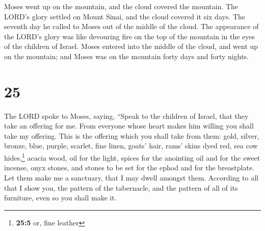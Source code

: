  Moses went up on the mountain, and the cloud covered the
mountain.  The LORD's glory settled on Mount Sinai, and
the cloud covered it six days. The seventh day he called to Moses out of
the middle of the cloud.  The appearance of the LORD's
glory was like devouring fire on the top of the mountain in the eyes of
the children of Israel.  Moses entered into the middle of
the cloud, and went up on the mountain; and Moses was on the mountain
forty days and forty nights.

\hypertarget{section-24}{%
\section{25}\label{section-24}}

 The LORD spoke to Moses, saying,  ``Speak
to the children of Israel, that they take an offering for me. From
everyone whose heart makes him willing you shall take my offering.
 This is the offering which you shall take from them:
gold, silver, bronze,  blue, purple, scarlet, fine linen,
goats' hair,  rams' skins dyed red, sea cow
hides,\footnote{\textbf{25:5} or, fine leather} acacia wood,
 oil for the light, spices for the anointing oil and for
the sweet incense,  onyx stones, and stones to be set for
the ephod and for the breastplate.  Let them make me a
sanctuary, that I may dwell amongst them.  According to
all that I show you, the pattern of the tabernacle, and the pattern of
all of its furniture, even so you shall make it.

